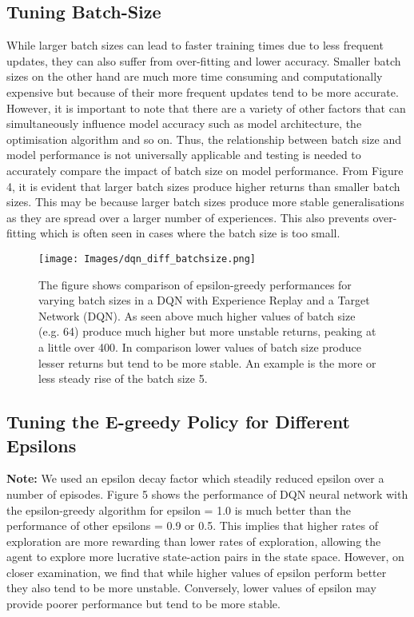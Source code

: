 \documentclass{article}
\begin{document}
\subsection{Tuning Batch-Size}

While larger batch sizes can lead to faster training times due to less frequent updates, they can also suffer from over-fitting and lower accuracy. Smaller batch sizes on the other hand are much more time consuming and computationally expensive but because of their more frequent updates tend to be more accurate.  However, it is important to note that there are a variety of other factors that can simultaneously influence model accuracy such as model architecture, the optimisation algorithm and so on. Thus, the relationship between batch size and model performance is not universally applicable and testing is needed to accurately compare the impact of batch size on model performance. 
\newline From Figure 4, it is evident that larger batch sizes produce higher returns than smaller batch sizes. This may be because larger batch sizes produce more stable generalisations as they are spread over a larger number of experiences. This also prevents over-fitting which is often seen in cases where the batch size is too small.


\begin{figure}[htbp]
\centering
\texttt{[image: Images/dqn\_diff\_batchsize.png]}
\caption{\label{fig:Comparison of epsilon-greedy performances} The figure shows comparison of epsilon-greedy performances for varying batch sizes in a DQN with Experience Replay and a Target Network (DQN). As seen above much higher values of batch size (e.g. 64) produce much higher but more unstable returns, peaking at a little over 400. In comparison lower values of batch size produce lesser returns but tend to be more stable. An example is the more or less steady rise of the batch size 5. }
\end{figure}

\subsection{Tuning the E-greedy Policy for Different Epsilons}

\textbf{Note:} We used an epsilon decay factor which steadily reduced epsilon over a number of episodes. \newline
Figure 5 shows the performance of DQN neural network with the epsilon-greedy algorithm for epsilon = 1.0 is much better than the performance of other epsilons = 0.9 or 0.5.  This implies that higher rates of exploration are more rewarding than lower rates of exploration, allowing the agent to explore more lucrative state-action pairs in the state space.  However, on closer examination, we find that while higher values of epsilon perform better they also tend to be more unstable. Conversely, lower values of epsilon may provide poorer performance but tend to be more stable.  \newline
\end{document}
